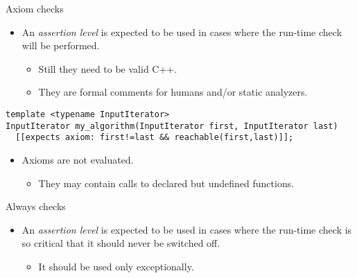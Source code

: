 \begin{frame}[t,fragile]{Axiom checks}
\begin{itemize}
  \item An  \emph{assertion level} is expected to be used in cases
where the run-time check will  be performed.
    \begin{itemize}
      \item Still they need to be valid C++.
      \item They are formal comments for humans and/or static analyzers.
    \end{itemize}
\end{itemize}

\vfill\pause
\begin{lstlisting}
template <typename InputIterator>
InputIterator my_algorithm(InputIterator first, InputIterator last)
  [[expects axiom: first!=last && reachable(first,last)]];
\end{lstlisting}

\vfill\pause
\begin{itemize}
  \item Axioms are not evaluated.
    \begin{itemize}
      \item They may contain calls to declared but undefined functions.
    \end{itemize}
\end{itemize}
\end{frame}

\begin{frame}[t,fragile]{Always checks}
\begin{itemize}
  \item An  \emph{assertion level} is expected to be used in cases
where the run-time check is so critical that it should never be switched off.
    \begin{itemize}
      \item It should be used only exceptionally.
    \end{itemize}
\end{itemize}
\end{frame}

